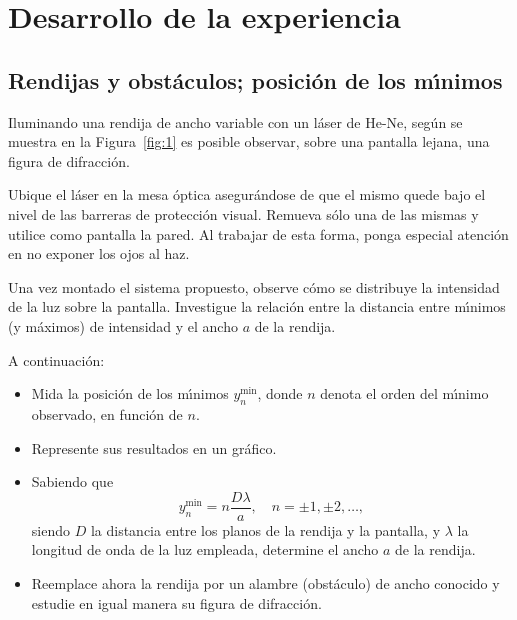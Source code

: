 \documentclass[laboratorio]{guia}
\begin{document}
\maketitle

\section{Desarrollo de la experiencia}

\subsection{Rendijas y obst\'aculos; posici\'on de los m\'\i nimos}

Iluminando una rendija de ancho variable con un l\'aser de He-Ne, 
seg\'un se muestra en la Figura~\ref{fig:1} es posible observar,
sobre una pantalla lejana, una figura de difracci\'on.

Ubique el l\'aser en la mesa \'optica asegur\'andose de que el 
mismo quede bajo el nivel de las barreras de protecci\'on visual.
Remueva s\'olo una de las mismas y utilice como pantalla la pared.
Al trabajar de esta forma, ponga especial atenci\'on en no exponer
los ojos al haz. 

Una vez montado el sistema propuesto, observe c\'omo se distribuye
la intensidad de la luz sobre la pantalla. Investigue la relaci\'on
entre la distancia entre m\'\i nimos (y m\'aximos) de intensidad y el
ancho $a$ de la rendija. 


A continuaci\'on:
\begin{itemize}
    \item Mida la posici\'on de los m\'\i nimos $y_n^\text{min}$, donde
        $n$ denota el orden del m\'\i nimo observado, en funci\'on de $n$.
    \item Represente sus resultados en un gr\'afico.
    \item Sabiendo que
        \begin{equation}
         y_n^\text{min} = n \frac{D \lambda}{a}, \quad n = \pm 1, \pm 2,
         \ldots,
        \end{equation}
siendo $D$ la distancia entre los planos de la rendija y la pantalla, y 
$\lambda$ la longitud de onda de la luz empleada, determine el ancho $a$
de la rendija.
\item Reemplace ahora la rendija por un alambre (obst\'aculo) de ancho conocido
y estudie en igual manera su figura de difracci\'on.
\end{itemize}
\end{document}
